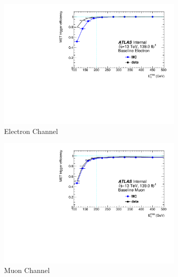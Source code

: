 \begin{figure}[htbp]
  \centering
     \begin{subfigure}{0.49\textwidth}
     \includegraphics[width = 0.98\textwidth]{Figures/5/efficiency_baseline_electron.pdf}
    \caption{Electron Channel}
    \label{fig:mettrig_e}
     \end{subfigure}
    \begin{subfigure}{0.49\textwidth}
     \includegraphics[width = 0.98\textwidth]{Figures/5/efficiency_baseline_muon.pdf}
     \caption{Muon Channel}
     \label{fig:mettrig_mu}
     \end{subfigure}
         \begin{subfigure}{0.49\textwidth}

\end{subfigure}
\end{figure}
